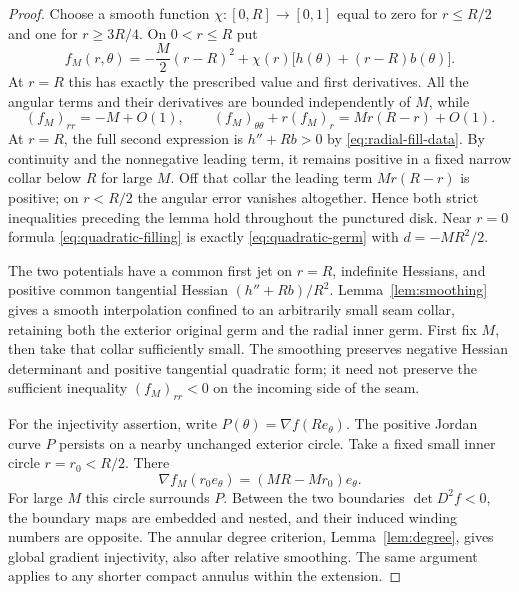 \documentclass[11pt]{amsart}
\theoremstyle{definition}
\theoremstyle{remark}
\numberwithin{equation}{section}
\begin{document}
\begin{proof}
Choose a smooth function $\chi:[0,R]\to[0,1]$ equal to zero for
$r\le R/2$ and one for $r\ge3R/4$. On $0<r\le R$ put
\begin{equation}\label{eq:quadratic-filling}
 f_M(r,\theta)=-\frac M2(r-R)^2
   +\chi(r)\bigl[h(\theta)+(r-R)b(\theta)\bigr].
\end{equation}
At $r=R$ this has exactly the prescribed value and first derivatives.
All the angular terms and their derivatives are bounded independently
of $M$, while
\begin{equation}\label{eq:quadratic-radial-signs}
 (f_M)_{rr}=-M+O(1),\qquad
 (f_M)_{\theta\theta}+r(f_M)_r
     =Mr(R-r)+O(1).
\end{equation}
At $r=R$, the full second expression is $h''+Rb>0$ by
\eqref{eq:radial-fill-data}. By continuity and the nonnegative
leading term, it remains positive in a fixed narrow collar below
$R$ for large $M$. Off that collar the leading term
$Mr(R-r)$ is positive; on $r<R/2$ the angular error vanishes altogether.
Hence both strict inequalities preceding the lemma hold throughout the
punctured disk. Near $r=0$ formula \eqref{eq:quadratic-filling} is
exactly \eqref{eq:quadratic-germ} with $d=-MR^2/2$.

The two potentials have a common first jet on $r=R$, indefinite
Hessians, and positive common tangential Hessian
$(h''+Rb)/R^2$. Lemma~\ref{lem:smoothing} gives a smooth
interpolation confined to an arbitrarily small seam collar, retaining
both the exterior original germ and the radial inner germ. First fix
$M$, then take that collar sufficiently small. The smoothing preserves
negative Hessian determinant and positive tangential quadratic form;
it need not preserve the sufficient inequality $(f_M)_{rr}<0$ on the
incoming side of the seam.

For the injectivity assertion, write $P(\theta)=\nabla f(Re_\theta)$.
The positive Jordan curve $P$ persists on a nearby unchanged exterior
circle. Take a fixed small inner circle $r=r_0<R/2$. There
\[
 \nabla f_M(r_0e_\theta)=(MR-Mr_0)e_\theta.
\]
For large $M$ this circle surrounds $P$. Between the two boundaries
$\det D^2f<0$, the boundary maps are embedded and nested, and their
induced winding numbers are opposite. The annular degree criterion,
Lemma~\ref{lem:degree}, gives global gradient injectivity, also after
relative smoothing. The same argument applies to any shorter compact
annulus within the extension.
\end{proof}
\end{document}
